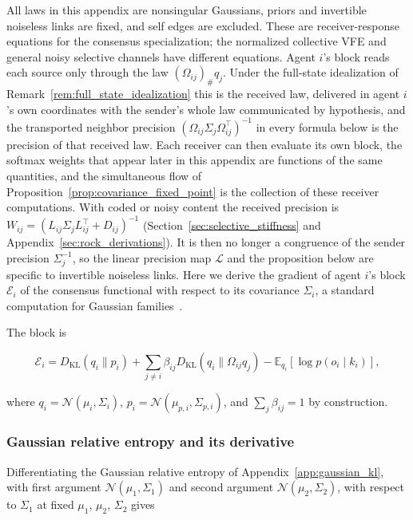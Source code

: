 All laws in this appendix are nonsingular Gaussians, priors and invertible noiseless links are fixed, and self edges are excluded. These are receiver-response equations for the consensus specialization; the normalized collective VFE and general noisy selective channels have different equations. Agent $i$'s block reads each source only through the law $(\Omega_{ij})_\#q_j$. Under the full-state idealization of Remark~\ref{rem:full_state_idealization} this is the received law, delivered in agent $i$'s own coordinates with the sender's whole law communicated by hypothesis, and the transported neighbor precision $(\Omega_{ij}\Sigma_j\Omega_{ij}^\top)^{-1}$ in every formula below is the precision of that received law. Each receiver can then evaluate its own block, the softmax weights that appear later in this appendix are functions of the same quantities, and the simultaneous flow of Proposition~\ref{prop:covariance_fixed_point} is the collection of these receiver computations. With coded or noisy content the received precision is $W_{ij}=(L_{ij}\Sigma_jL_{ij}^\top+D_{ij})^{-1}$ (Section~\ref{sec:selective_stiffness} and Appendix~\ref{sec:rock_derivations}). It is then no longer a congruence of the sender precision $\Sigma_j^{-1}$, so the linear precision map $\mathcal L$ and the proposition below are specific to invertible noiseless links. Here we derive the gradient of agent $i$'s block $\mathcal{E}_i$ of the consensus functional with respect to its covariance $\Sigma_i$, a standard computation for Gaussian families~\cite{Amari2016, petersen2012matrix}.

The block is

\begin{equation}
\mathcal{E}_i
=D_{\mathrm{KL}}(q_i \| p_i)
+ \sum_{j \neq i} \beta_{ij}
D_{\mathrm{KL}}(q_i \| \Omega_{ij} q_j)
- \mathbb{E}_{q_i}[\log p(o_i \mid k_i)],
\end{equation}

where $q_i = \mathcal{N}(\mu_i, \Sigma_i)$, $p_i = \mathcal{N}(\mu_{p,i}, \Sigma_{p,i})$, and $\sum_j \beta_{ij} = 1$ by construction.

\subsubsection{Gaussian relative entropy and its derivative}

Differentiating the Gaussian relative entropy of Appendix~\ref{app:gaussian_kl}, with first argument $\mathcal{N}(\mu_1,\Sigma_1)$ and second argument $\mathcal{N}(\mu_2,\Sigma_2)$, with respect to $\Sigma_1$ at fixed $\mu_1$, $\mu_2$, $\Sigma_2$ gives


